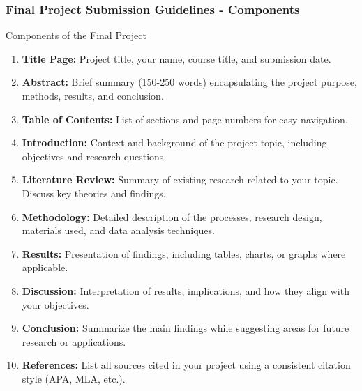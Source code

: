 \documentclass[aspectratio=169]{beamer}
\begin{document}
\begin{frame}[fragile]
    \frametitle{Final Project Submission Guidelines - Components}
    \begin{block}{Components of the Final Project}
        \begin{enumerate}
            \item \textbf{Title Page:} Project title, your name, course title, and submission date.
            \item \textbf{Abstract:} Brief summary (150-250 words) encapsulating the project purpose, methods, results, and conclusion.
            \item \textbf{Table of Contents:} List of sections and page numbers for easy navigation.
            \item \textbf{Introduction:} Context and background of the project topic, including objectives and research questions.
            \item \textbf{Literature Review:} Summary of existing research related to your topic. Discuss key theories and findings.
            \item \textbf{Methodology:} Detailed description of the processes, research design, materials used, and data analysis techniques.
            \item \textbf{Results:} Presentation of findings, including tables, charts, or graphs where applicable.
            \item \textbf{Discussion:} Interpretation of results, implications, and how they align with your objectives.
            \item \textbf{Conclusion:} Summarize the main findings while suggesting areas for future research or applications.
            \item \textbf{References:} List all sources cited in your project using a consistent citation style (APA, MLA, etc.).
        \end{enumerate}
    \end{block}
\end{frame}
\end{document}
